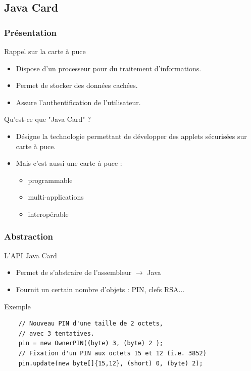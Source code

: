 \documentclass{beamer}
\begin{document}
\subsection{Java Card}
\begin{frame}
    \frametitle{Présentation}
    \begin{block}{Rappel sur la carte à puce}
        \begin{itemize}
            \item Dispose d'un processeur pour du traitement d'informations.
            \item Permet de stocker des données cachées.
            \item Assure l'authentification de l'utilisateur.
        \end{itemize}
    \end{block}
    \begin{block}{Qu'est-ce que "Java Card" ?}
        \begin{itemize}
            \item Désigne la technologie permettant de développer
                des applets \og sécurisées \fg{} sur carte à puce.

            \item Mais c'est aussi une carte à puce : 
                \begin{itemize}
                    \item programmable 
                    \item multi-applications
                    \item interopérable
                \end{itemize}
        \end{itemize}
    \end{block}
\end{frame}

\begin{frame}[fragile]
    \frametitle{Abstraction}
    \begin{block}{L'API Java Card}
        \begin{itemize}
            \item Permet de s'abstraire de l'assembleur $\rightarrow$ Java
            \item Fournit un certain nombre d'objets : PIN, clefs RSA...
        \end{itemize}
    \end{block}
    \begin{block}{Exemple}
    
        \begin{lstlisting}
    // Nouveau PIN d'une taille de 2 octets, 
    // avec 3 tentatives.
    pin = new OwnerPIN((byte) 3, (byte) 2 );
    // Fixation d'un PIN aux octets 15 et 12 (i.e. 3852)
    pin.update(new byte[]{15,12}, (short) 0, (byte) 2);
        \end{lstlisting}
    \end{block}
\end{frame}
\end{document}
